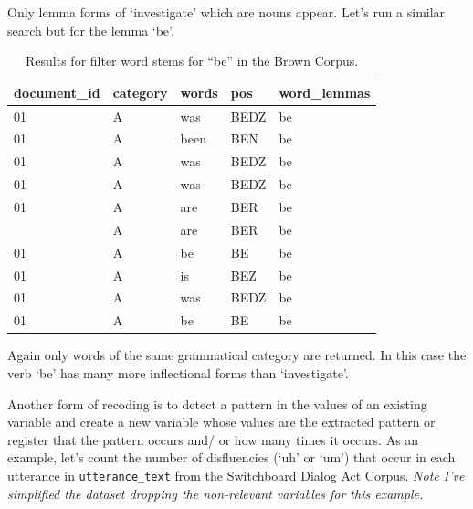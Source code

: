 \documentclass[
  letterpaper,
]{latex/krantz}
\begin{document}
Only lemma forms of `investigate' which are nouns appear. Let's run a
similar search but for the lemma `be'.

\hypertarget{tbl-recoding-lemmatization-brown-be}{}
\begin{table}
\caption{\label{tbl-recoding-lemmatization-brown-be}Results for filter word stems for ``be'' in the Brown Corpus. }\tabularnewline

\centering
\begin{tabular}{lllll}
\toprule
document\_id & category & words & pos & word\_lemmas\\
\midrule
01 & A & was & BEDZ & be\\
01 & A & been & BEN & be\\
01 & A & was & BEDZ & be\\
01 & A & was & BEDZ & be\\
01 & A & are & BER & be\\
\addlinespace
01 & A & are & BER & be\\
01 & A & be & BE & be\\
01 & A & is & BEZ & be\\
01 & A & was & BEDZ & be\\
01 & A & be & BE & be\\
\bottomrule
\end{tabular}
\end{table}

Again only words of the same grammatical category are returned. In this
case the verb `be' has many more inflectional forms than `investigate'.

Another form of recoding is to detect a pattern in the values of an
existing variable and create a new variable whose values are the
extracted pattern or register that the pattern occurs and/ or how many
times it occurs. As an example, let's count the number of disfluencies
(`uh' or `um') that occur in each utterance in \texttt{utterance\_text}
from the Switchboard Dialog Act Corpus. \emph{Note I've simplified the
dataset dropping the non-relevant variables for this example.}
\end{document}
